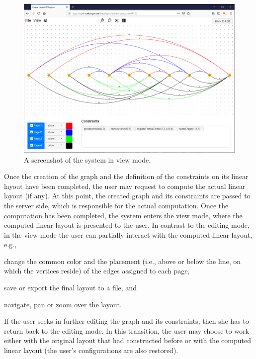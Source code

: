 \documentclass[runningheads]{llncs}
\begin{document}
\begin{figure}[t]
	\centering
	\includegraphics[width=\textwidth]{viewmode}
	\caption{A screenshot of the system in view mode.}
	\label{fig:viewmode}
\end{figure}

Once the creation of the graph and the definition of the constraints on its linear layout have been completed, the user may request to compute the actual linear layout (if any). At this point, the created graph and its constraints are passed to the server side, which is responsible for the actual computation. Once the computation has been completed, the system enters the view mode, where the computed linear layout is presented to the user. In contrast to the editing mode, in the view mode the user can partially interact with the computed linear layout, e.g., 
\begin{inparaenum}[(i)]
\item change the common color and the placement (i.e., above or below the line, on which the vertices reside) of the edges assigned to each page,
\item save or export the final layout to a file, and 
\item navigate, pan or zoom over the layout.
\end{inparaenum}

If the user seeks in further editing the graph and its constraints, then she has to return back to the editing mode. In this transition, the user may choose to work either with the original layout that had constructed before or with the computed linear layout (the user's configurations are also restored). 
\end{document}
